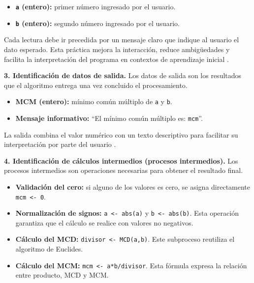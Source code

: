 \documentclass[12pt,twoside]{book}
\begin{document}
						\begin{itemize}
							\item \textbf{\texttt{a} (entero):} primer número ingresado por el usuario.
							\item \textbf{\texttt{b} (entero):} segundo número ingresado por el usuario.
						\end{itemize}
						
						\noindent
						Cada lectura debe ir precedida por un mensaje claro que indique al usuario el dato esperado. Esta práctica mejora la interacción, reduce ambigüedades y facilita la interpretación del programa en contextos de aprendizaje inicial \cite{Gaddis2022Starting,Farrell2018Programming}.
						
						\noindent
						\textbf{3. Identificación de datos de salida.}
						Los datos de salida son los resultados que el algoritmo entrega una vez concluido el procesamiento.
						
						\begin{itemize}
							\item \textbf{MCM (entero):} mínimo común múltiplo de \texttt{a} y \texttt{b}.
							\item \textbf{Mensaje informativo:} ``El mínimo común múltiplo es: \texttt{mcm}''.
						\end{itemize}
						
						\noindent
						La salida combina el valor numérico con un texto descriptivo para facilitar su interpretación por parte del usuario \cite{Gaddis2022Starting,Farrell2018Programming}.
						
						\noindent
						\textbf{4. Identificación de cálculos intermedios (procesos intermedios).}
						Los procesos intermedios son operaciones necesarias para obtener el resultado final.
						
						\begin{itemize}
							\item \textbf{Validación del cero:} si alguno de los valores es cero, se asigna directamente \texttt{mcm <- 0}.
							\item \textbf{Normalización de signos:} \texttt{a <- abs(a)} y \texttt{b <- abs(b)}. Esta operación garantiza que el cálculo se realice con valores no negativos.
							\item \textbf{Cálculo del MCD:} \texttt{divisor <- MCD(a,b)}. Este subproceso reutiliza el algoritmo de Euclides.
							\item \textbf{Cálculo del MCM:} \texttt{mcm <- a*b/divisor}. Esta fórmula expresa la relación entre producto, MCD y MCM.
						\end{itemize}
						
\end{document}
